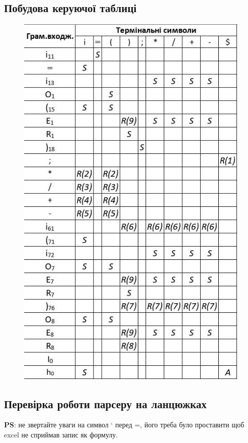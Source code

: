 \clearpage
\subsection{Побудова керуючої таблиці}
\begin{figure}[h!]
  \centering
  \includegraphics[width=14cm]{reports/formals/assets/action.jpeg}
\end{figure}

\clearpage
\subsection{Перевірка роботи парсеру на ланцюжках}
\textbf{PS}: не звертайте уваги на символ ` перед =, його треба було проставити щоб excel не сприймав запис як формулу.\\

